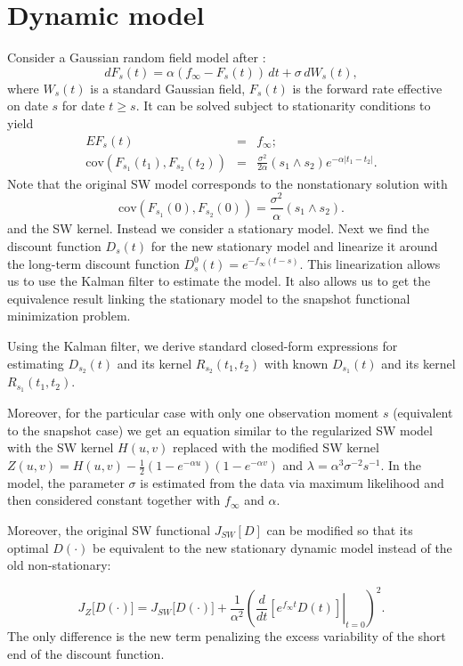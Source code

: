 \documentclass[a4paper]{iccf2017}
\begin{document}
\section{Dynamic model}
Consider a Gaussian random field model after \cite{kennedy1994term,goldstein2000term}:
$$
dF_s(t) = \alpha(f_\infty - F_s(t))\,dt + \sigma\, dW_s(t),
$$
where $W_s(t)$ is a standard Gaussian field, $F_s(t)$ is the forward rate effective on date $s$ for date $t\geq s$. It can be solved subject to stationarity conditions to yield
\begin{eqnarray}
EF_s(t)&=&f_\infty;\\
\mathrm{cov}\left(F_{s_1}(t_1),F_{s_2}(t_2)\right)&=&\frac{\sigma^2}{2\alpha}(s_1\wedge s_2)e^{-\alpha|t_1-t_2|}.
\end{eqnarray}
Note that the original SW model corresponds to the nonstationary solution with
$$
\mathrm{cov}\left(F_{s_1}(0),F_{s_2}(0)\right)=\frac{\sigma^2}{\alpha}(s_1\wedge s_2).
$$
and the SW kernel. Instead we consider a stationary model.
Next we find the discount function $D_s(t)$ for the new stationary model and linearize it around the long-term discount function $D^0_s(t)=e^{-f_\infty(t-s)}$. This linearization allows us to use the Kalman filter to estimate the model. It also allows us to get the equivalence result linking the stationary model to the snapshot functional minimization problem.

Using the Kalman filter, we derive standard closed-form expressions for estimating $D_{s_2}(t)$ and its kernel $R_{s_2}(t_1,t_2)$ with known $D_{s_1}(t)$ and its kernel $R_{s_1}(t_1,t_2)$.

Moreover, for the particular case with only one observation moment $s$ (equivalent to the snapshot case) we get an equation similar to the regularized SW model with the SW kernel $H(u,v)$ replaced with the modified SW kernel $Z(u,v)=H(u,v)-\frac12(1-e^{-\alpha u})(1-e^{-\alpha v})$ and $\lambda=\alpha^3\sigma^{-2}s^{-1}$. In the model, the parameter $\sigma$ is estimated from the data via maximum likelihood and then considered constant together with $f_\infty$ and $\alpha$.

Moreover, the original SW functional $J_{SW}[D]$ can be modified so that its optimal $D(\cdot)$ be equivalent to the new stationary dynamic model instead of the old non-stationary:

$$
J_{Z}\big[D(\cdot)\big] = J_{SW}\big[D(\cdot)\big]
+
\frac{1}{\alpha^2}
\left(
\left. \frac{d}{dt}\left[e^{f_\infty t}D(t)\right]\right|_{t=0}
\right)^2.
$$
The only difference is the new term penalizing the excess variability of the short end of the discount function.
\end{document}
